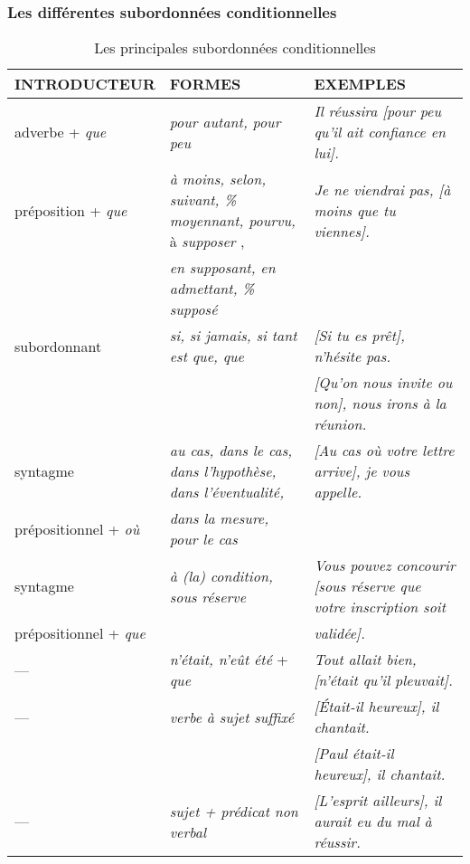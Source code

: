 \documentclass[UTF8]{report}
\begin{document}
\subsubsection{Les différentes subordonnées conditionnelles}
\begin{table}[H]
    \centering
    \small
    \begin{adjustbox}{max width = \textwidth}
        \begin{tabular}{|l|l|l|}
        \hline
        \rowcolor{cyan!20}
        \textbf{INTRODUCTEUR} & \textbf{FORMES} & \textbf{EXEMPLES} \\
        \hline
        adverbe + \textit{que} & \textit{pour autant, pour peu} & \textit{Il réussira [pour peu qu'il ait confiance en lui].} \\
        \hline
        préposition + \textit{que} & \textit{à moins, selon, suivant, \% moyennant, pourvu,} à \textit{supposer} , & \textit{Je ne viendrai pas, [à moins que tu viennes].} \\
        & \textit{en supposant, en admettant, \% supposé} & \\
        \hline
        subordonnant & \textit{si, si jamais, si tant est que, que} & \textit{[Si tu es prêt], n'hésite pas.} \\
        & & \textit{[Qu'on nous invite ou non], nous irons à la réunion.} \\
        \hline
        syntagme & \textit{au cas, dans le cas, dans l'hypothèse, dans l'éventualité,} & \textit{[Au cas où votre lettre arrive], je vous appelle.} \\
        prépositionnel + \textit{où} & \textit{dans la mesure, pour le cas} & \\
        \hline
        syntagme & \textit{à (la) condition, sous réserve} & \textit{Vous pouvez concourir [sous réserve que votre inscription soit} \\
        prépositionnel + \textit{que} & & \textit{validée].} \\
        \hline
        --- & \textit{n'était, n'eût été} + \textit{que} & \textit{Tout allait bien, [n'était qu'il pleuvait].} \\
        \hline
        --- & \textit{verbe à sujet suffixé} & \textit{[Était-il heureux], il chantait.} \\
        & & \textit{[Paul était-il heureux], il chantait.} \\
        \hline
        --- & \textit{sujet + prédicat non verbal} & \textit{[L'esprit ailleurs], il aurait eu du mal à réussir.} \\
        \hline
        \end{tabular}
    \end{adjustbox}
    \caption{Les principales subordonnées conditionnelles}
\end{table}
\end{document}

